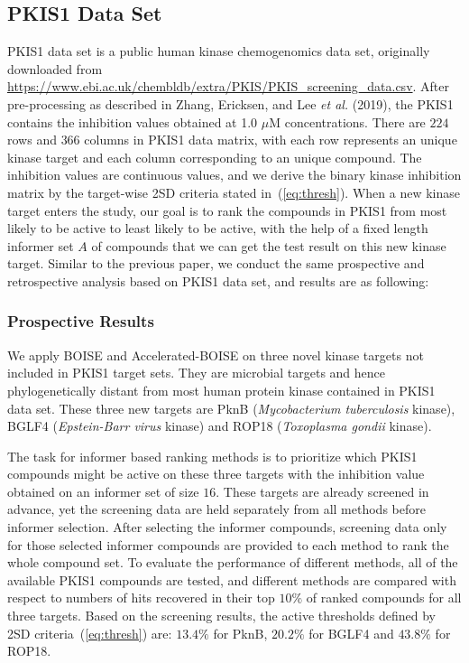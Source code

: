 \documentclass[12pt]{article}
\begin{document}
\subsection{PKIS1 Data Set}
PKIS1 data set is a public human kinase chemogenomics data set, originally downloaded from \url{https://www.ebi.ac.uk/chembldb/extra/PKIS/PKIS_screening_data.csv}. After pre-processing as described in Zhang, Ericksen, and Lee {\em et al.} (2019), the PKIS1 contains the inhibition values obtained at 1.0 $\mu$M concentrations. There are $224$ rows and $366$ columns in PKIS1 data matrix, with each row represents an unique kinase target and each column corresponding to an unique compound. The inhibition values are continuous values, and we derive the binary kinase inhibition matrix by the target-wise 2SD criteria stated in~(\ref{eq:thresh}). When a new kinase target enters the study, our goal is to rank the compounds in PKIS1 from most likely to be active to least likely to be active, with the help of a fixed length informer set $A$ of compounds that we can get the test result on this new kinase target. Similar to the previous paper, we conduct the same prospective and retrospective analysis based on PKIS1 data set, and results are as following:

\subsubsection{Prospective Results}
We apply BOISE and Accelerated-BOISE on three novel kinase targets not included in PKIS1 target sets. They are microbial targets and hence phylogenetically distant from most human protein kinase contained in PKIS1 data set. These three new targets are PknB (\textit{Mycobacterium tuberculosis} kinase), BGLF4 (\textit{Epstein-Barr virus} kinase) and ROP18 (\textit{Toxoplasma gondii} kinase). 

The task for informer based ranking methods is to prioritize which PKIS1 compounds might be active on these three targets with the inhibition value obtained on an informer set of size $16$. These targets are already screened in advance, yet the screening data are held separately from all methods before informer selection. After selecting the informer compounds, screening data only for those selected informer compounds are provided to each method to rank the whole compound set. To evaluate the performance of different methods, all of the available PKIS1 compounds are tested, and different methods are compared with respect to numbers of hits recovered in their top $10\%$ of ranked compounds for all three targets. Based on the screening results, the active thresholds defined by 2SD criteria~(\ref{eq:thresh}) are: $13.4\%$ for PknB, $20.2\%$ for BGLF4 and $43.8\%$ for ROP18.
\end{document}
